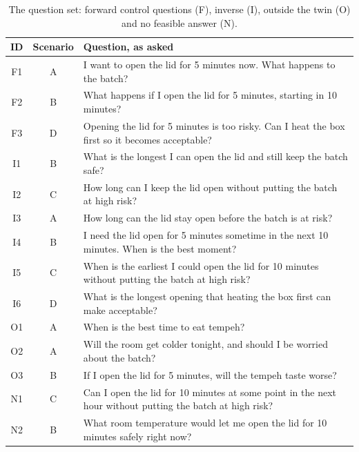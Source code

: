   \begin{table}[H]
    \centering
    \small
    \begin{tabular}{@{}ccp{12cm}@{}}
      \toprule
      \textbf{ID} & \textbf{Scenario} & \textbf{Question, as asked} \\
      \midrule
      F1 & A & I want to open the lid for 5 minutes now. What happens to the batch? \\
      F2 & B & What happens if I open the lid for 5 minutes, starting in 10 minutes? \\
      F3 & D & Opening the lid for 5 minutes is too risky. Can I heat the box first so
                        it becomes acceptable? \\
      \midrule
      I1 & B & What is the longest I can open the lid and still keep the batch safe? \\
      I2 & C & How long can I keep the lid open without putting the batch at high
                          risk? \\
      I3 & A & How long can the lid stay open before the batch is at risk? \\
      I4 & B & I need the lid open for 5 minutes sometime in the next 10 minutes. When
                          is the best moment? \\
      I5 & C & When is the earliest I could open the lid for 10 minutes without putting
                          the batch at high risk? \\
      I6 & D & What is the longest opening that heating the box first can make
                          acceptable? \\
      \midrule
      O1 & A & When is the best time to eat tempeh? \\
      O2 & A & Will the room get colder tonight, and should I be worried about the
                          batch? \\
      O3 & B & If I open the lid for 5 minutes, will the tempeh taste worse? \\
      \midrule
      N1 & C & Can I open the lid for 10 minutes at some point in the next hour without
                          putting the batch at high risk? \\
      N2 & B & What room temperature would let me open the lid for 10 minutes safely right
                          now? \\
      \bottomrule
    \end{tabular}
    \caption{The question set: forward control questions (F), inverse (I), outside the twin (O)
    and no feasible answer (N).}
    \label{tab:questions}
  \end{table}

